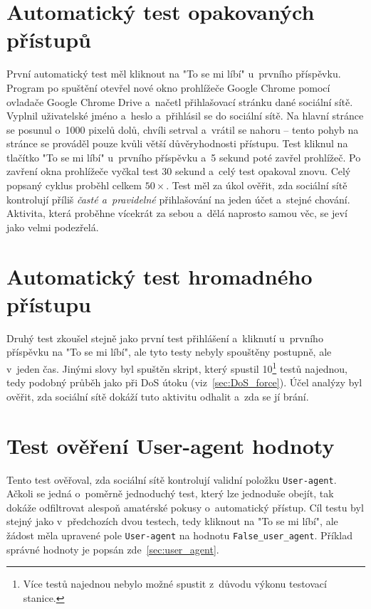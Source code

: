 \section*{Automatický test opakovaných přístupů}
\label{sec:repeated_behaviour}
První automatický test měl kliknout na "To se mi líbí" u~prvního příspěvku. Program po spuštění otevřel nové okno prohlížeče Google Chrome pomocí ovladače Google Chrome Drive a~načetl přihlašovací stránku dané sociální sítě. Vyplnil uživatelské jméno a~heslo a~přihlásil se do sociální sítě. Na hlavní stránce se posunul o~1000 pixelů dolů, chvíli setrval a~vrátil se nahoru -- tento pohyb na stránce se prováděl pouze kvůli větší důvěryhodnosti přístupu. Test kliknul na tlačítko "To se mi líbí" u~prvního příspěvku a~5 sekund poté zavřel prohlížeč. Po zavření okna prohlížeče vyčkal test 30 sekund a~celý test opakoval znovu. Celý popsaný cyklus proběhl celkem $50\times$. Test měl za úkol ověřit, zda sociální sítě kontrolují příliš \emph{časté a~pravidelné} přihlašování na jeden účet a~stejné chování. Aktivita, která proběhne vícekrát za sebou a~dělá naprosto samou věc, se jeví jako velmi podezřelá.

\section*{Automatický test hromadného přístupu}
\label{sec:dos_test}
Druhý test zkoušel stejně jako první test přihlášení a~kliknutí u~prvního příspěvku na "To se mi líbí", ale tyto testy nebyly spouštěny postupně, ale v~jeden čas. Jinými slovy byl spuštěn skript, který spustil 10\footnote{Více testů najednou nebylo možné spustit z~důvodu výkonu testovací stanice.} testů najednou, tedy podobný průběh jako při DoS útoku (viz~\ref{sec:DoS_force}). Účel analýzy byl ověřit, zda sociální sítě dokáží tuto aktivitu odhalit a~zda se jí brání.

\section*{Test ověření User-agent hodnoty}
Tento test ověřoval, zda sociální sítě kontrolují validní položku \texttt{User-agent}. Ačkoli se jedná o~poměrně jednoduchý test, který lze jednoduše obejít, tak dokáže odfiltrovat alespoň amatérské pokusy o~automatický přístup. Cíl testu byl stejný jako v~předchozích dvou testech, tedy kliknout na "To se mi líbí", ale žádost měla upravené pole \texttt{User\--agent} na hodnotu \texttt{False\_user\_agent}. Příklad správné hodnoty je popsán zde~\ref{sec:user_agent}.

